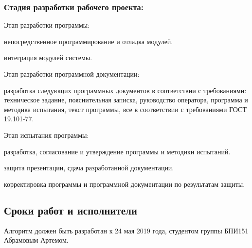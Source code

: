 \subsubsection{Стадия разработки рабочего проекта:}
\begin{my_enumerate}
\item Этап разработки программы:
    \begin{my_enumerate}
    \item непосредственное программирование и отладка модулей.
    \item интеграция модулей системы.
    \end{my_enumerate}
\item Этап разработки программной документации:
    \begin{my_enumerate}
    \item разработка следующих программных документов в соответствии с требованиями: техническое задание, пояснительная записка, руководство оператора, программа и методика испытания, текст программы, все в соответствии с требованиями ГОСТ 19.101-77.
    \end{my_enumerate}
\item Этап испытания программы:    
    \begin{my_enumerate}
    \item разработка, согласование и утверждение программы и методики испытаний.
    \item защита презентации, сдача разработанной документации.
    \item корректировка программы и программной документации по результатам защиты.
    \end{my_enumerate}
\end{my_enumerate}


\subsection{Сроки работ и исполнители}
Алгоритм должен быть разработан к 24 мая 2019 года, студентом группы БПИ151 Абрамовым Артемом.
